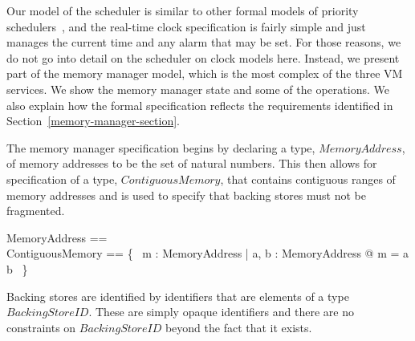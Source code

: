 \documentclass[a4paper,10pt]{report}
\begin{document}
Our model of the scheduler is similar to other formal models of
priority schedulers~\cite{ferreira2014, gotsman2013, klein2014,
  lime2009}, and the real-time clock specification is fairly simple
and just manages the current time and any alarm that may be set.
For those reasons, we do not go into detail on the scheduler on clock
models here.
Instead, we present part of the memory manager model, which is the
most complex of the three VM services.
We show the memory manager state and some of the operations.
We also explain how the formal specification reflects the requirements
identified in Section~\ref{memory-manager-section}.

The memory manager specification begins by declaring a type,
$MemoryAddress$, of memory addresses to be the set of natural numbers.
This then allows for specification of a type, $ContiguousMemory$, that
contains contiguous ranges of memory addresses and is used to specify
that backing stores must not be fragmented.
%
\begin{zed}
  MemoryAddress == \nat \\
  ContiguousMemory == \{~ m : \power MemoryAddress | \exists a, b :
  MemoryAddress @ m = a \upto b ~\}
\end{zed}
%
Backing stores are identified by identifiers that are elements of a
type $BackingStoreID$.
These are simply opaque identifiers and there are no constraints on
$BackingStoreID$ beyond the fact that it exists.
\end{document}
